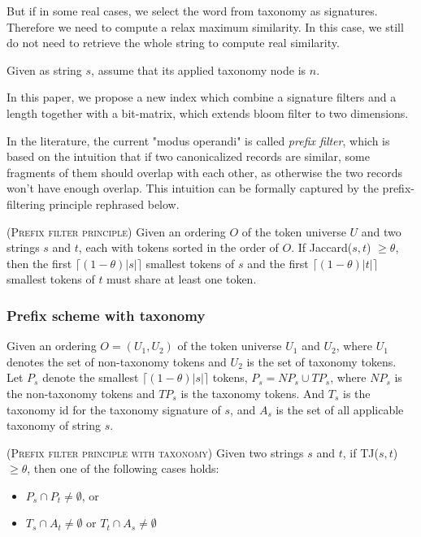But if in some real cases, we select the word from taxonomy as signatures. Therefore we need to compute a relax maximum similarity. In this case, we still do not need to retrieve the whole string to compute real similarity.

Given as string $s$, assume that its applied taxonomy node is $n$.

In this paper, we propose a new index which combine a signature filters and a length together with a bit-matrix, which extends bloom filter to two dimensions.

In the literature, the current "modus operandi" is called \textit{prefix filter}, which is based on the intuition that if two canonicalized records are similar, some fragments of them should overlap with each other, as otherwise the two records
won't have enough overlap. This intuition can be formally captured by the prefix-filtering
principle \cite{conf/icde/ChaudhuriGK06} rephrased below.

\begin{lem} (\textsc{Prefix filter principle}) \cite{conf/icde/ChaudhuriGK06} Given an
ordering $O$ of the token universe $U$ and two strings $s$ and $t$, each with tokens sorted in the
order of $O$.   If Jaccard($s, t$) $\geq \theta$, then the first $\lceil(1-\theta)|s|\rceil$ smallest
tokens of $s$ and the first $\lceil(1-\theta)|t|\rceil$ smallest
tokens of $t$  must share at least one token.
\end{lem}

\subsubsection{Prefix scheme with taxonomy}

Given an
ordering $O = (U_1 , U_2 )$ of the token universe $U_1$ and $U_2$, where $U_1$ denotes the set of non-taxonomy tokens and $U_2$ is the set of taxonomy tokens. Let $P_s$ denote the smallest $\lceil(1-\theta)|s|\rceil$ tokens, $P_s = NP_s \cup TP_s$, where $NP_s$ is the non-taxonomy tokens and $TP_s$ is the taxonomy tokens. And $T_s$ is the taxonomy id for the taxonomy signature of $s$, and $A_s$ is the set of all applicable taxonomy of string $s$.

\begin{lem} (\textsc{Prefix filter principle with taxonomy})  Given two strings $s$ and $t$, if TJ($s, t$) $\geq \theta$, then one of the following cases holds:

 \begin{itemize}
   \item $P_s \cap P_t \neq \emptyset$, or
   \item  $T_s \cap A_t \neq \emptyset$ or $T_t \cap A_s \neq \emptyset$
 \end{itemize}

\end{lem}


